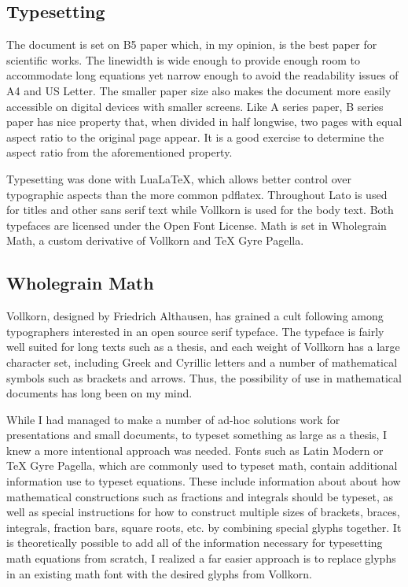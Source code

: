 \documentclass[]{report}
\theoremstyle{definition}
\begin{document}
\subsection*{Typesetting}

The document is set on B5 paper which, in my opinion, is the best paper for scientific works.
The linewidth is wide enough to provide enough room to accommodate long equations yet narrow enough to avoid the readability issues of A4 and US Letter.
The smaller paper size also makes the document more easily accessible on digital devices with smaller screens.
Like A series paper, B series paper has nice property that, when divided in half longwise, two pages with equal aspect ratio to the original page appear.
It is a good exercise to determine the aspect ratio from the aforementioned property.

Typesetting was done with LuaLaTeX, which allows better control over typographic aspects than the more common pdflatex.
Throughout Lato is used for titles and other sans serif text while Vollkorn is used for the body text.
Both typefaces are licensed under the Open Font License.
Math is set in Wholegrain Math, a custom derivative of Vollkorn and TeX Gyre Pagella.


\subsection*{Wholegrain Math}

Vollkorn, designed by Friedrich Althausen, has grained a cult following among typographers interested in an open source serif typeface.
The typeface is fairly well suited for long texts such as a thesis, and each weight of Vollkorn has a large character set, including Greek and Cyrillic letters and a number of mathematical symbols such as brackets and arrows.
Thus, the possibility of use in mathematical documents has long been on my mind.

While I had managed to make a number of ad-hoc solutions work for presentations and small documents, to typeset something as large as a thesis, I knew a more intentional approach was needed.
Fonts such as Latin Modern or TeX Gyre Pagella, which are commonly used to typeset math, contain additional information use to typeset equations.
These include information about about how mathematical constructions such as fractions and integrals should be typeset, as well as special instructions for how to construct multiple sizes of brackets, braces, integrals, fraction bars, square roots, etc. by combining special glyphs together.
It is theoretically possible to add all of the information necessary for typesetting math equations from scratch, I realized a far easier approach is to replace glyphs in an existing math font with the desired glyphs from Vollkorn. 
\end{document}
